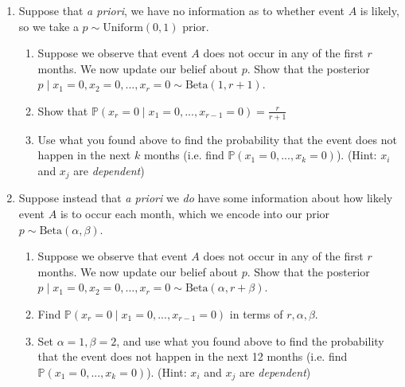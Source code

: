 \documentclass[11pt]{article}
\begin{document}
\begin{enumerate}
    

    \item Suppose that \textit{a priori}, we have no information as to whether event $A$ is likely, so we take a $p \sim \text{Uniform}(0, 1)$ prior.
    \begin{enumerate}
    
    \item Suppose we observe that event $A$ does not occur in any of the first $r$ months. We now update our belief about $p$. Show that the posterior $p \mid x_1=0, x_2 = 0, ..., x_r = 0 \sim \text{Beta}(1, r+1)$.
    
    \item Show that $\mathbb{P}(x_r = 0 \mid x_1=0, ..., x_{r-1} = 0) = \frac{r}{r+1}$

    \item Use what you found above to find the probability that the event does not happen in the next $k$ months (i.e. find $\mathbb{P}(x_1 = 0, ..., x_k = 0)$).
    (Hint: $x_i$ and $x_j$ are \textit{dependent}) 
    \end{enumerate}
    
    
    
    \item Suppose instead that \textit{a priori} we \textit{do} have some information about how likely event $A$ is to occur each month, which we encode into our prior $p \sim \text{Beta}(\alpha, \beta)$.

    \begin{enumerate}
    
    \item Suppose we observe that event $A$ does not occur in any of the first $r$ months. We now update our belief about $p$. Show that the posterior $p \mid x_1=0, x_2 = 0, ..., x_r = 0 \sim \text{Beta}(\alpha, r + \beta)$.
    
    \item Find $\mathbb{P}(x_r = 0 \mid x_1=0, ..., x_{r-1} = 0)$ in terms of $r, \alpha, \beta$.

    \item Set $\alpha = 1, \beta = 2$, and use what you found above to find the probability that the event does not happen in the next 12 months (i.e. find $\mathbb{P}(x_1 = 0, ..., x_k = 0)$).
    (Hint: $x_i$ and $x_j$ are \textit{dependent}) 
    \end{enumerate}

\end{enumerate}
\end{document}
